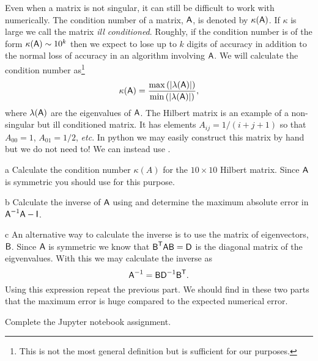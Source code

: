 \documentclass[]{homework}
\begin{document}
\begin{problem}{2}
  Even when a matrix is not singular, it can still be difficult to work with
  numerically.  The condition number of a matrix, $\textsf A$, is denoted by
  $\kappa(\textsf A)$.  If $\kappa$ is large we call the matrix \emph{ill
    conditioned}.  Roughly, if the condition number is of the form
  $\kappa(\textsf A)\sim 10^k$ then we expect to lose up to $k$ digits of
  accuracy in addition to the normal loss of accuracy in an algorithm
  involving $\textsf A$.  We will calculate the condition number
  as\footnote{This is not the most general definition but is sufficient for our
    purposes.}
  \[ \kappa(\textsf A) = \frac{\max\left( |\lambda(\textsf A)|
    \right)}{\min\left( |\lambda(\textsf A)| \right)}, \]
  where $\lambda(\textsf A)$ are the eigenvalues of $\textsf A$.  The Hilbert
  matrix is an example of a non-singular but ill conditioned matrix.  It
  has elements $A_{ij} = 1/(i+j+1)$ so that $A_{00}=1$, $A_{01}=1/2$,
  \textit{etc}.  In python we may easily construct this matrix by hand but
  we do not need to!  We can instead use
  . 
  \begin{subproblem}{a}
    Calculate the condition number $\kappa(A)$ for the $10\times10$ Hilbert
    matrix.  Since $\textsf A$ is symmetric you should use
     for this purpose.
  \end{subproblem}
  \begin{subproblem}{b}
    Calculate the inverse of $\textsf A$ using 
    and determine the maximum absolute
    error in ${\textsf A}^{-1}\textsf A-\textsf I$.
  \end{subproblem}
  \begin{subproblem}{c}
    An alternative way to calculate the inverse is to use the matrix of
    eigenvectors, $\textsf B$.  Since $\textsf A$ is symmetric we know that
    ${\textsf B}^{\textsf T}\textsf A\textsf B = \textsf D$ is the diagonal matrix of the
    eigvenvalues.  With this we may calculate the inverse as
    \[ {\textsf A}^{-1} = \textsf B{\textsf D}^{-1}{\textsf B}^{\textsf T}. \]
    Using this expression repeat the previous part.  We should find in
    these two parts that the maximum error is huge compared to the expected
    numerical error.
  \end{subproblem}
\end{problem}


\begin{problem}{3}
  Complete the Jupyter notebook assignment.
\end{problem}
\end{document}
